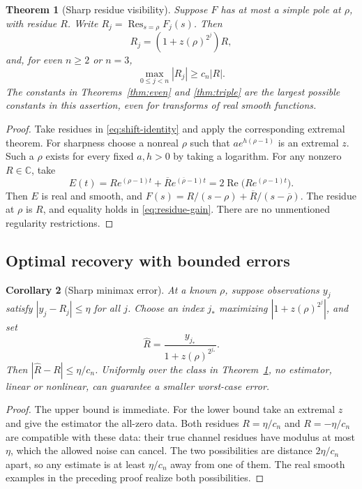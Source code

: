 \documentclass[11pt,a4paper]{article}
\newtheorem{theorem}{Theorem}[section]
\newtheorem{corollary}[theorem]{Corollary}
\theoremstyle{definition}\newtheorem{definition}[theorem]{Definition}
\theoremstyle{remark}\newtheorem{remark}[theorem]{Remark}
\newcommand{\C}{\mathbb C}\newcommand{\R}{\mathbb R}
\newcommand{\Res}{\operatorname{Res}}
\newcommand{\Rea}{\operatorname{Re}}
\begin{document}
\begin{theorem}[Sharp residue visibility]\label{thm:residue}
Suppose $F$ has at most a simple pole at $\rho$, with residue $R$. Write $R_j=\Res_{s=\rho}F_j(s)$. Then
\[
R_j=(1+z(\rho)^{2^j})R,
\]
and, for even $n\ge2$ or $n=3$,
\begin{equation}\label{eq:residue-gain}
\boxed{\ \max_{0\le j<n}|R_j|\ge c_n|R|.\ }
\end{equation}
The constants in Theorems~\ref{thm:even} and \ref{thm:triple} are the largest possible constants in this assertion, even for transforms of real smooth functions.
\end{theorem}
\begin{proof}
Take residues in \eqref{eq:shift-identity} and apply the corresponding extremal theorem.
For sharpness choose a nonreal $\rho$ such that $a e^{h(\rho-1)}$ is an extremal $z$. Such a $\rho$ exists for every fixed $a,h>0$ by taking a logarithm. For any nonzero $R\in\C$, take
\[
E(t)=R e^{(\rho-1)t}+\overline R e^{(\overline\rho-1)t}
=2\Rea\bigl(R e^{(\rho-1)t}\bigr).
\]
Then $E$ is real and smooth, and
$F(s)=R/(s-\rho)+\overline R/(s-\overline\rho)$. The residue at $\rho$ is $R$, and equality holds in \eqref{eq:residue-gain}. There are no unmentioned regularity restrictions.
\end{proof}

\subsection{Optimal recovery with bounded errors}
\begin{corollary}[Sharp minimax error]\label{cor:noise}
At a known $\rho$, suppose observations $y_j$ satisfy
$|y_j-R_j|\le\eta$ for all $j$. Choose an index $j_*$ maximizing
$|1+z(\rho)^{2^j}|$, and set
\[
\widehat R=\frac{y_{j_*}}{1+z(\rho)^{2^{j_*}}}.
\]
Then $|\widehat R-R|\le\eta/c_n$. Uniformly over the class in Theorem~\ref{thm:residue}, no estimator, linear or nonlinear, can guarantee a smaller worst-case error.
\end{corollary}
\begin{proof}
The upper bound is immediate. For the lower bound take an extremal $z$ and give the estimator the all-zero data. Both residues $R=\eta/c_n$ and $R=-\eta/c_n$ are compatible with these data: their true channel residues have modulus at most $\eta$, which the allowed noise can cancel. The two possibilities are distance $2\eta/c_n$ apart, so any estimate is at least $\eta/c_n$ away from one of them. The real smooth examples in the preceding proof realize both possibilities.
\end{proof}
\end{document}
